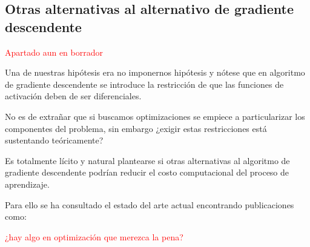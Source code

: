 
\subsection{Otras alternativas al alternativo de gradiente descendente}  

\textcolor{red}{ Apartado aun en borrador} 

Una de nuestras hipótesis era no imponernos 
hipótesis y nótese que en algoritmo de gradiente descendente se introduce la restricción de que 
las funciones de activación deben de ser diferenciales. 

No es de extrañar que si buscamos optimizaciones  se empiece a particularizar los componentes del problema, sin embargo ¿exigir estas restricciones está sustentando teóricamente? 

Es totalmente lícito y natural plantearse si otras alternativas al algoritmo de gradiente descendente podrían reducir el costo computacional del proceso de aprendizaje. 

Para ello se ha consultado el estado del arte actual  encontrando publicaciones como: 

\textcolor{red}{¿hay algo en optimización que merezca la pena?}

\cite{TransactionsOnNeuralNetworks}

